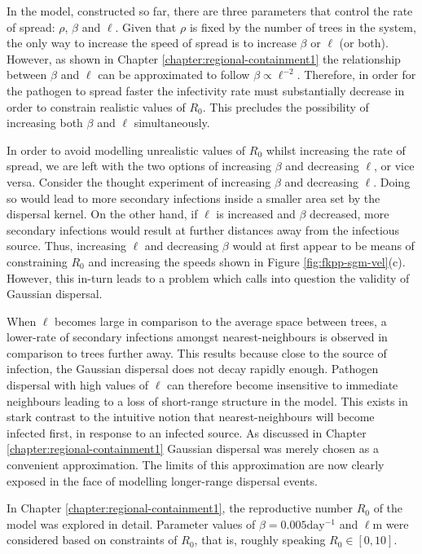 In the model,  constructed so far, there are three parameters that control the rate of spread: $\rho$, $\beta$ and $\ell$. %
Given that $\rho$ is fixed by the number of trees in the system, the only way to increase the speed of spread is to increase $\beta$ or $\ell$ (or both). %
However, as shown in Chapter \ref{chapter:regional-containment1} the relationship between $\beta$ and $\ell$ can be approximated to follow $\beta \propto \ell^{-2}$. %
Therefore, in order for the pathogen to spread faster the infectivity rate must substantially decrease in order to constrain realistic values of $R_0$. This precludes the possibility of increasing both $\beta$ and $\ell$ simultaneously. %

In order to avoid modelling unrealistic values of $R_0$ whilst increasing the rate of spread, %
we are left with the two options of increasing $\beta$ and decreasing $\ell$, or vice versa. %
Consider the thought experiment of increasing $\beta$ and decreasing $\ell$. Doing so would lead to more secondary infections inside a smaller area set by the dispersal kernel. %
On the other hand, if $\ell$ is increased and $\beta$ decreased, more secondary infections would result at further distances away from the infectious source. %
Thus, increasing $\ell$ and decreasing $\beta$ would at first appear to be means of constraining $R_0$ and increasing the speeds shown in Figure \ref{fig:fkpp-sgm-vel}(c). %
However, this in-turn leads to a problem which calls into question the validity of Gaussian dispersal. %

When $\ell$ becomes large in comparison to the average space between trees, %
a lower-rate of secondary infections amongst nearest-neighbours is observed in comparison to trees further away. %
This results because close to the source of infection, the  Gaussian dispersal does not decay rapidly enough. Pathogen dispersal with high values of $\ell$ can therefore become insensitive to immediate neighbours leading to a loss of short-range structure in the model. %
This exists in stark contrast to the intuitive notion that nearest-neighbours will become infected first, in response to an infected source. %
As discussed in Chapter \ref{chapter:regional-containment1} Gaussian dispersal was merely chosen as a convenient approximation. The limits of this approximation are now clearly exposed in the face of modelling longer-range dispersal events. %

In Chapter \ref{chapter:regional-containment1}, the reproductive number $R_0$ of the model was explored in detail. Parameter values of $\beta=0.005\mathrm{day^{-1}}$ and $\ell\mathrm{m}$ were considered based on constraints of $R_0$, that is, roughly speaking $R_0 \in [0, 10]$. 

